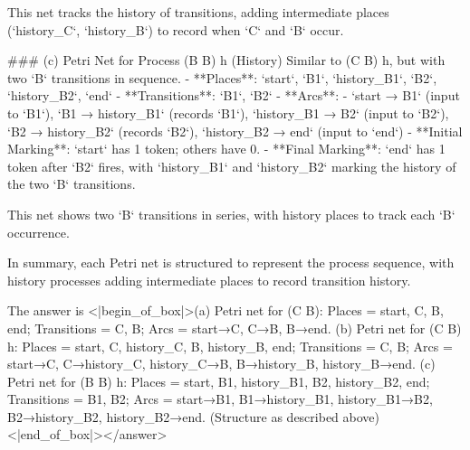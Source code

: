This net tracks the history of transitions, adding intermediate places (`history_C`, `history_B`) to record when `C` and `B` occur.  


### (c) Petri Net for Process (B B) h (History)  
Similar to (C B) h, but with two `B` transitions in sequence.  
- **Places**: `start`, `B1`, `history_B1`, `B2`, `history_B2`, `end`  
- **Transitions**: `B1`, `B2`  
- **Arcs**:  
  - `start → B1` (input to `B1`), `B1 → history_B1` (records `B1`), `history_B1 → B2` (input to `B2`), `B2 → history_B2` (records `B2`), `history_B2 → end` (input to `end`)  
- **Initial Marking**: `start` has 1 token; others have 0.  
- **Final Marking**: `end` has 1 token after `B2` fires, with `history_B1` and `history_B2` marking the history of the two `B` transitions.  

This net shows two `B` transitions in series, with history places to track each `B` occurrence.  


In summary, each Petri net is structured to represent the process sequence, with history processes adding intermediate places to record transition history.  

The answer is <|begin_of_box|>(a) Petri net for (C B): Places = start, C, B, end; Transitions = C, B; Arcs = start→C, C→B, B→end.  
(b) Petri net for (C B) h: Places = start, C, history_C, B, history_B, end; Transitions = C, B; Arcs = start→C, C→history_C, history_C→B, B→history_B, history_B→end.  
(c) Petri net for (B B) h: Places = start, B1, history_B1, B2, history_B2, end; Transitions = B1, B2; Arcs = start→B1, B1→history_B1, history_B1→B2, B2→history_B2, history_B2→end. (Structure as described above)<|end_of_box|></answer>